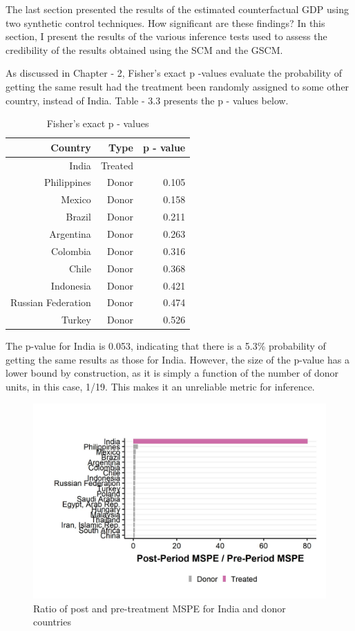 \documentclass[12pt,nobind, a4paper]{reedthesis}
\begin{document}
 The last section presented the results of the estimated counterfactual GDP using two synthetic control techniques. How significant are these findings? In this section, I present the results of the various inference tests used to assess the credibility of the results obtained using the SCM and the GSCM.
 \linebreak

 As discussed in Chapter - 2, Fisher's exact p -values evaluate the probability of getting the same result had the treatment been randomly assigned to some other country, instead of India. Table - 3.3 presents the p - values below.
 \begin{table}[h!!]
 \centering
 \begin{tabular}{rrr}
 \hline
 Country& Type & p - value\\
 \hline
 India & Treated & \B 0.053\\
 \hline
 Philippines & Donor & 0.105\\
 \hline
 Mexico & Donor & 0.158\\
 \hline
 Brazil & Donor & 0.211\\
 \hline
 Argentina & Donor & 0.263\\
 \hline
 Colombia & Donor & 0.316\\
 \hline
 Chile & Donor & 0.368\\
 \hline
 Indonesia & Donor & 0.421\\
 \hline
 Russian Federation & Donor & 0.474\\
 \hline
 Turkey & Donor & 0.526\\
 \hline
 \end{tabular}
 \caption{Fisher's exact p - values}
 \end{table}
 The p-value for India is 0.053, indicating that there is a 5.3\% probability of getting the same results as those for India. However, the size of the p-value has a lower bound by construction, as it is simply a function of the number of donor units, in this case, 1/19. This makes it an unreliable metric for inference.
 \newpage
 \begin{figure}

 {\centering \includegraphics[width=1\linewidth]{figure/msperatio} 

 }

 \caption{Ratio of post and pre-treatment MSPE for India and donor countries}\label{fig:msper}
 \end{figure}
\end{document}
